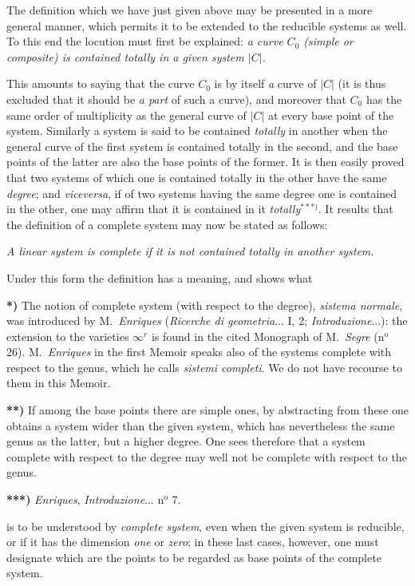 \documentclass{article}
\begin{document}
The definition which we have just given above may be presented in a more general manner, which permits it to be extended to the reducible systems as well. To this end the locution must first be explained: \emph{a curve $C_{0}$ (simple or composite) is contained totally in a given system $|C|$.}

This amounts to saying that the curve $C_{0}$ is by itself \emph{a} curve of $|C|$ (it is thus excluded that it should be \emph{a part} of such a curve), and moreover that $C_{0}$ has the same order of multiplicity as the general curve of $|C|$ at every base point of the system. Similarly a system is said to be contained \emph{totally} in another when the general curve of the first system is contained totally in the second, and the base points of the latter are also the base points of the former. It is then easily proved that two systems of which one is contained totally in the other have the same \emph{degree}; and \emph{viceversa}, if of two systems having the same degree one is contained in the other, one may affirm that it is contained in it \emph{totally}${}^{***)}$. It results that the definition of a complete system may now be stated as follows:

\emph{A linear system is complete if it is not contained totally in another system.}

Under this form the definition has a meaning, and shows what

\textbf{*)} The notion of complete system (with respect to the degree), \emph{sistema normale}, was introduced by M.\ \emph{Enriques} (\emph{Ricerche di geometria}... I, 2; \emph{Introduzione}...): the extension to the varieties $\infty^{r}$ is found in the cited Monograph of M.\ \emph{Segre} (n${}^{\text{o}}$ 26). M.\ \emph{Enriques} in the first Memoir speaks also of the systems complete with respect to the genus, which he calls \emph{sistemi completi}. We do not have recourse to them in this Memoir.

\textbf{**)} If among the base points there are simple ones, by abstracting from these one obtains a system wider than the given system, which has nevertheless the same genus as the latter, but a higher degree. One sees therefore that a system complete with respect to the degree may well not be complete with respect to the genus.

\textbf{***)} \emph{Enriques}, \emph{Introduzione}... n${}^{\text{o}}$ 7.

is to be understood by \emph{complete system}, even when the given system is reducible, or if it has the dimension \emph{one} or \emph{zero}; in these last cases, however, one must designate which are the points to be regarded as base points of the complete system.
\end{document}
